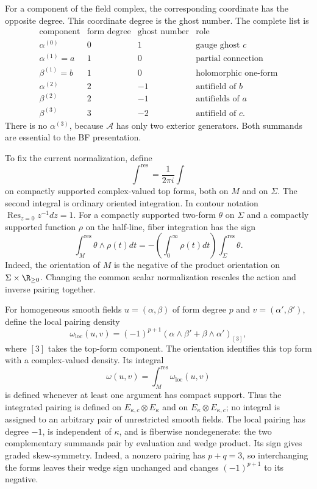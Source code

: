 For a component of the field complex, the corresponding coordinate
has the opposite degree.  This coordinate degree is the ghost number.
The complete list is
\[
\begin{array}{c|c|c|l}
 \text{component}&\text{form degree}&\text{ghost number}&\text{role}\\\hline
 \alpha^{(0)}&0&1&\text{gauge ghost }c\\
 \alpha^{(1)}=a&1&0&\text{partial connection}\\
 \beta^{(1)}=b&1&0&\text{holomorphic one-form}\\
 \alpha^{(2)}&2&-1&\text{antifield of }b\\
 \beta^{(2)}&2&-1&\text{antifields of }a\\
 \beta^{(3)}&3&-2&\text{antifield of }c .
\end{array}
\]
There is no $\alpha^{(3)}$, because $\mathcal A$ has only two
exterior generators.  Both summands are essential to the BF presentation.

To fix the current normalization, define
\[
 \int^{\mathrm{res}}=\frac1{2\pi i}\int
\]
on compactly supported complex-valued top forms, both on $M$ and on $\Sigma$.
The second integral is ordinary oriented integration.  In contour
notation $\operatorname{Res}_{z=0}z^{-1}dz=1$.
For a compactly supported two-form $\theta$ on $\Sigma$ and a
compactly supported function $\rho$ on the half-line, fiber integration
has the sign
\[
 \int_M^{\mathrm{res}}\theta\wedge\rho(t)dt
 =-\left(\int_0^\infty\rho(t)dt\right)
                  \int_\Sigma^{\mathrm{res}}\theta.
\]
Indeed, the orientation of $M$ is the negative of the product
orientation on $\Sigma\times\R_{\ge0}$.
Changing the common scalar normalization rescales the action and
inverse pairing together.

For homogeneous smooth fields $u=(\alpha,\beta)$ of form degree $p$
and $v=(\alpha',\beta')$, define the local pairing density
\[
 \omega_{\mathrm{loc}}(u,v)=(-1)^{p+1}
       (\alpha\wedge\beta'+\beta\wedge\alpha')_{[3]},
\]
where $[3]$ takes the top-form component.  The orientation identifies
this top form with a complex-valued density.  Its integral
\[
 \omega(u,v)=\int_M^{\mathrm{res}}\omega_{\mathrm{loc}}(u,v)
\]
is defined whenever at least one argument has compact support.
Thus the integrated pairing is defined on
$E_{\kappa,c}\otimes E_\kappa$ and on
$E_\kappa\otimes E_{\kappa,c}$; no integral is assigned to an arbitrary
pair of unrestricted smooth fields.
The local pairing has degree $-1$, is independent of $\kappa$, and is
fiberwise nondegenerate: the two complementary summands pair by
evaluation and wedge product.  Its sign gives graded skew-symmetry.
Indeed, a nonzero pairing has $p+q=3$, so interchanging the forms leaves
their wedge sign unchanged and changes $(-1)^{p+1}$ to its negative.

